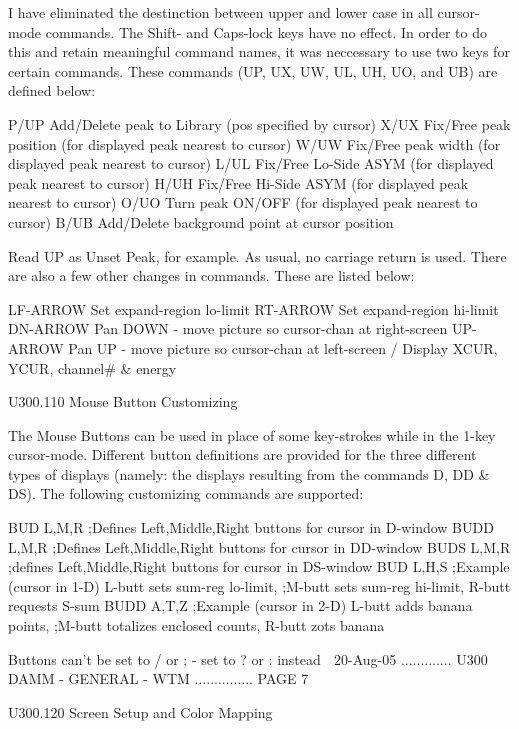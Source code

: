    I have eliminated the destinction between  upper  and  lower  case  in  all
   cursor-mode  commands.  The  Shift-  and  Caps-lock keys have no effect. In
   order to do this and retain meaningful command names, it was neccessary  to
   use  two keys for certain commands. These commands (UP, UX, UW, UL, UH, UO,
   and UB) are defined below:
 
   P/UP   Add/Delete peak to Library (pos specified by cursor)
   X/UX   Fix/Free  peak position (for displayed peak nearest to cursor)
   W/UW   Fix/Free  peak width    (for displayed peak nearest to cursor)
   L/UL   Fix/Free  Lo-Side ASYM  (for displayed peak nearest to cursor)
   H/UH   Fix/Free  Hi-Side ASYM  (for displayed peak nearest to cursor)
   O/UO   Turn peak  ON/OFF       (for displayed peak nearest to cursor)
   B/UB   Add/Delete background point at cursor position
 
   Read UP as Unset Peak, for example. As usual, no carriage return  is  used.
   There are also a few other changes in commands. These are listed below:
 
   LF-ARROW    Set expand-region lo-limit
   RT-ARROW    Set expand-region hi-limit
   DN-ARROW    Pan DOWN - move picture so cursor-chan at right-screen
   UP-ARROW    Pan UP   - move picture so cursor-chan at  left-screen
   /           Display XCUR, YCUR, channel# & energy
 
   U300.110  Mouse Button Customizing
 
   The  Mouse  Buttons  can  be used in place of some key-strokes while in the
   1-key cursor-mode. Different button definitions are provided for the  three
   different  types  of  displays  (namely:  the  displays  resulting from the
   commands  D, DD & DS). The following customizing commands are supported:
 
   BUD  L,M,R  ;Defines Left,Middle,Right buttons for cursor in  D-window
   BUDD L,M,R  ;Defines Left,Middle,Right buttons for cursor in DD-window
   BUDS L,M,R  ;defines Left,Middle,Right buttons for cursor in DS-window
   BUD  L,H,S  ;Example (cursor in 1-D)   L-butt sets sum-reg lo-limit,
               ;M-butt sets sum-reg hi-limit,  R-butt requests S-sum
   BUDD A,T,Z  ;Example (cursor in 2-D)   L-butt adds banana points,
               ;M-butt totalizes enclosed counts,  R-butt zots banana
 
   Buttons can't be set to  / or ;  -  set to  ? or :  instead
    
   20-Aug-05 ............. U300  DAMM - GENERAL - WTM ............... PAGE   7
 
   U300.120  Screen Setup and Color Mapping
 
